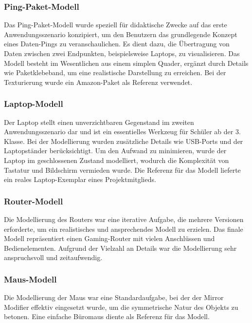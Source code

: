 \subsubsection*{Ping-Paket-Modell}
Das Ping-Paket-Modell wurde speziell für didaktische Zwecke auf das erste Anwendungsszenario konzipiert, um den Benutzern das grundlegende Konzept eines Daten-Pings zu veranschaulichen. Es dient dazu, die Übertragung von Daten zwischen zwei Endpunkten, beispielsweise Laptops, zu visualisieren. Das Modell besteht im Wesentlichen aus einem simplen Quader, ergänzt durch Details wie Paketklebeband, um eine realistische Darstellung zu erreichen. Bei der Texturierung wurde ein Amazon-Paket als Referenz verwendet.

\subsubsection*{Laptop-Modell}
Der Laptop stellt einen unverzichtbaren Gegenstand im zweiten Anwendungsszenario dar und ist ein essentielles Werkzeug für Schüler ab der 3. Klasse. Bei der Modellierung wurden zusätzliche Details wie USB-Ports und der Laptopständer berücksichtigt. Um den Aufwand zu minimieren, wurde der Laptop im geschlossenen Zustand modelliert, wodurch die Komplexität von Tastatur und Bildschirm vermieden wurde. Die Referenz für das Modell lieferte ein reales Laptop-Exemplar eines Projektmitglieds.

\subsubsection*{Router-Modell}
Die Modellierung des Routers war eine iterative Aufgabe, die mehrere Versionen erforderte, um ein realistisches und ansprechendes Modell zu erzielen. Das finale Modell repräsentiert einen Gaming-Router mit vielen Anschlüssen und Bedienelementen. Aufgrund der Vielzahl an Details war die Modellierung sehr anspruchsvoll und zeitaufwendig.

\subsubsection*{Maus-Modell}
Die Modellierung der Maus war eine Standardaufgabe, bei der der Mirror Modifier effektiv eingesetzt wurde, um die symmetrische Natur des Objekts zu betonen. Eine einfache Büromaus diente als Referenz für das Modell.


